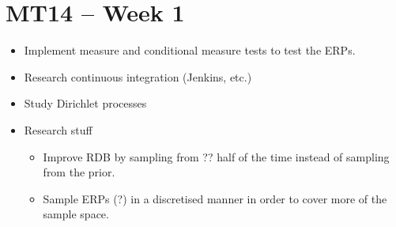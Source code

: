 \section{MT14 -- Week 1}
\begin{itemize}
	\item Implement measure and conditional measure tests to test the ERPs.
	\item Research continuous integration (Jenkins, etc.)
	\item Study Dirichlet processes
	\item Research stuff
		\begin{itemize}
			\item Improve RDB by sampling from ?? half of the time instead of sampling from the prior.
			\item Sample ERPs (?) in a discretised manner in order to cover more of the sample space.
		\end{itemize}
\end{itemize}